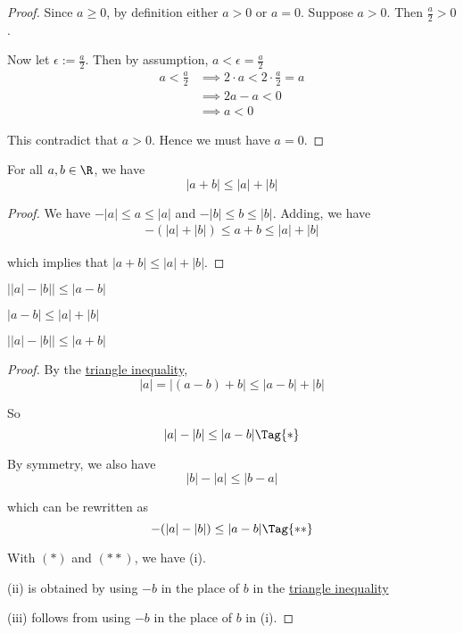 \begin{proof}
  Since $a\geq0$, by definition either $a>0$ or $a=0$. Suppose $a>0$. Then
  $\frac a2>0$.

  Now let $\epsilon:=\frac a2$. Then by assumption, $a<\epsilon=\frac a2$
  \begin{align*}
    a<\frac a2 &\implies 2\cdot a<2\cdot\frac a2=a \\
               &\implies 2a-a<0                    \\
               &\implies a<0
  \end{align*}

  This contradict that $a>0$. Hence we must have $a=0$.
\end{proof}

\label{f1288ad}

For all $a,b\in\R$, we have
$$
  |a+b|\leq|a|+|b|
$$

\begin{proof}
  We have $-|a|\leq a\leq|a|$ and $-|b|\leq b\leq|b|$. Adding, we have
  \begin{align*}
    -(|a|+|b|)\leq a+b\leq |a|+|b|
  \end{align*}

  which implies that $|a+b|\leq|a|+|b|$.
\end{proof}

\label{f699f4d}

\begin{enumerati}
  \item $\big||a|-|b|\big|\leq|a-b|$
  \item $|a-b|\leq|a|+|b|$
  \item $\big||a|-|b|\big|\leq|a+b|$
\end{enumerati}

\begin{proof}
  By the \href{f1288ad}{triangle inequality},
  $$
    |a|=|(a-b)+b|\leq|a-b|+|b|
  $$

  So
  \begin{equation*}
    |a|-|b|\leq|a-b|\Tag{*}
  \end{equation*}

  By symmetry, we also have
  $$
    |b|-|a|\leq|b-a|
  $$

  which can be rewritten as
  \begin{equation*}
    -(|a|-|b|)\leq|a-b|\Tag{**}
  \end{equation*}

  With $(*)$ and $(**)$, we have (i).

  (ii) is obtained by using $-b$ in the place of $b$ in the
  \href{f1288ad}{triangle inequality}

  (iii) follows from using $-b$ in the place of $b$ in (i).
\end{proof}

